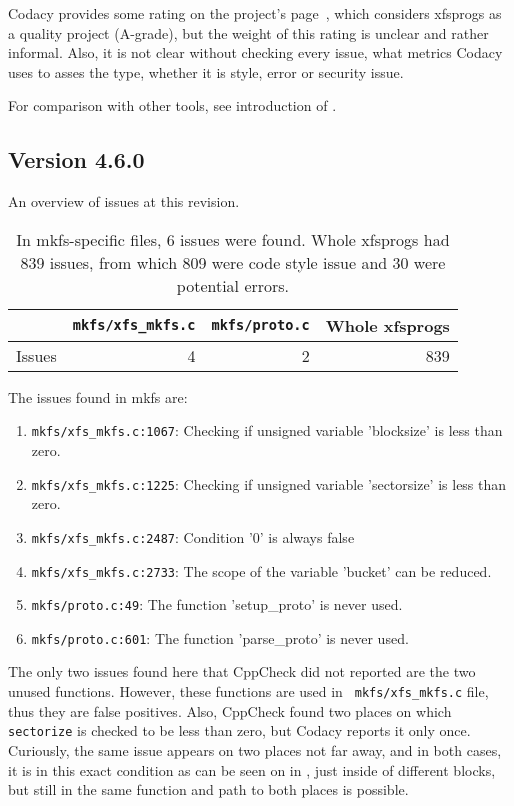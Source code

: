 Codacy provides some rating on the project's page~\cite{codacyXfsprogs},
which considers xfsprogs as a quality project (A-grade), but the weight of
this rating is unclear and rather informal. Also, it is not clear without
checking every issue, what metrics Codacy uses to asses the type, whether
it is style, error or security issue.

For comparison with other tools, see introduction of .

\subsection{Version 4.6.0}\label{chap:results:codacy:4.6}

An overview of issues at this revision.
\begin{table}[h]
\begin{tabular}{|l||r|r||r|}
\hline
& {\tt mkfs/xfs\_mkfs.c} & {\tt mkfs/proto.c} & Whole xfsprogs \\
\hline
Issues & 4 & 2 & 839 \\
\hline
\end{tabular}
\caption{In mkfs-specific files, 6 issues were found. Whole
xfsprogs had 839 issues, from which 809 were code style issue and 30 were
potential errors.}
\end{table}

The issues found in mkfs are:
\begin{enumerate}
	\item {\tt mkfs/xfs\_mkfs.c:1067}: Checking if unsigned variable 'blocksize' is less than zero.
	\item {\tt mkfs/xfs\_mkfs.c:1225}: Checking if unsigned variable 'sectorsize' is less than zero.
	\item {\tt mkfs/xfs\_mkfs.c:2487}: Condition '0' is always false
	\item {\tt mkfs/xfs\_mkfs.c:2733}: The scope of the variable 'bucket' can be reduced.
	\item {\tt mkfs/proto.c:49}: The function 'setup\_proto' is never used.
	\item {\tt mkfs/proto.c:601}: The function 'parse\_proto' is never used.
\end{enumerate}

The only two issues found here that CppCheck did not reported are the two
unused functions. However, these functions are used in {\tt
mkfs/xfs\_mkfs.c} file, thus they are false positives. Also, CppCheck found
two places on which {\tt sectorize} is checked to be less than zero, but
Codacy reports it only once. Curiously, the same issue appears on two
places not far away, and in both cases, it is in this exact condition as
can be seen on  in
, just inside of different blocks, but still in
the same function and path to both places is possible.

